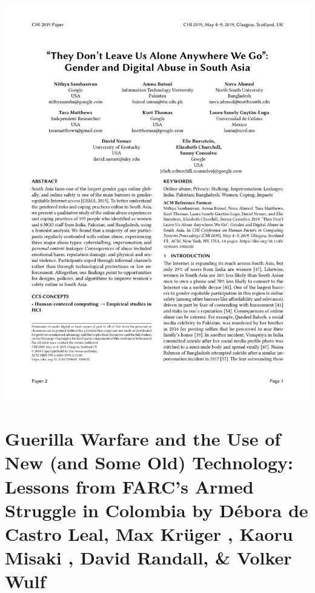 \documentclass[aspectratio=169,10pt]{beamer} %
\begin{document}
\begin{frame}
\includegraphics[page=8,width=\textwidth]{pdfs/they_dont_leave_us_alone.pdf}
\end{frame}


\section[Guerilla Warfare and the Use of New (and Some Old) Technology: Lessons from FARC's Armed Struggle in Colombia]{Guerilla Warfare and the Use of New (and Some Old) Technology: Lessons from FARC's Armed Struggle in Colombia {\scriptsize \color{Black} by \textbf{Débora de Castro Leal},  \textbf{Max Krüger },  \textbf{Kaoru Misaki },  \textbf{David Randall}, \& \textbf{Volker Wulf}}}
\end{document}
